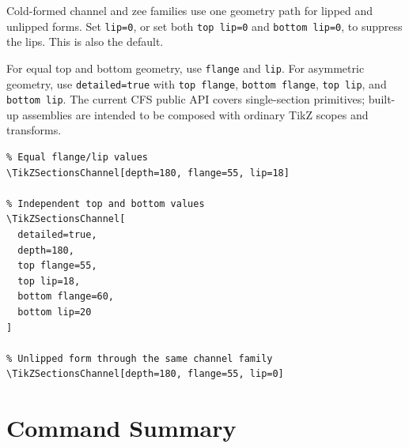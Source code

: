 \documentclass[10pt]{article}
\newcommand{\keyname}[1]{\texttt{#1}}
\begin{document}
Cold-formed channel and zee families use one geometry path for lipped and
unlipped forms. Set \keyname{lip=0}, or set both \keyname{top lip=0} and
\keyname{bottom lip=0}, to suppress the lips. This is also the default.

For equal top and bottom geometry, use \keyname{flange} and \keyname{lip}. For
asymmetric geometry, use \keyname{detailed=true} with \keyname{top flange},
\keyname{bottom flange}, \keyname{top lip}, and \keyname{bottom lip}. The
current CFS public API covers single-section primitives; built-up assemblies are
intended to be composed with ordinary TikZ scopes and transforms.

\begin{lstlisting}
% Equal flange/lip values
\TikZSectionsChannel[depth=180, flange=55, lip=18]

% Independent top and bottom values
\TikZSectionsChannel[
  detailed=true,
  depth=180,
  top flange=55,
  top lip=18,
  bottom flange=60,
  bottom lip=20
]

% Unlipped form through the same channel family
\TikZSectionsChannel[depth=180, flange=55, lip=0]
\end{lstlisting}

\section{Command Summary}
\end{document}
